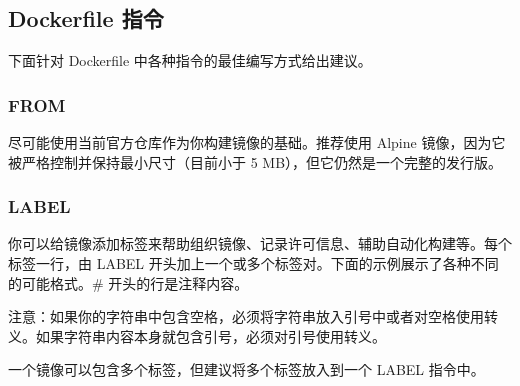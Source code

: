 \documentclass[letterpaper,10pt,english]{sphinxmanual}
\begin{document}
\subsection{Dockerfile 指令}
\label{\detokenize{docker/appendix:dockerfile}}
下面针对 Dockerfile 中各种指令的最佳编写方式给出建议。


\subsubsection{FROM}
\label{\detokenize{docker/appendix:from}}
尽可能使用当前官方仓库作为你构建镜像的基础。推荐使用 Alpine 镜像，因为它被严格控制并保持最小尺寸（目前小于 5 MB），但它仍然是一个完整的发行版。


\subsubsection{LABEL}
\label{\detokenize{docker/appendix:label}}
你可以给镜像添加标签来帮助组织镜像、记录许可信息、辅助自动化构建等。每个标签一行，由 LABEL 开头加上一个或多个标签对。下面的示例展示了各种不同的可能格式。\# 开头的行是注释内容。

注意：如果你的字符串中包含空格，必须将字符串放入引号中或者对空格使用转义。如果字符串内容本身就包含引号，必须对引号使用转义。

\begin{sphinxVerbatim}[commandchars=\\\{\}]
 

 

 

 
\end{sphinxVerbatim}

一个镜像可以包含多个标签，但建议将多个标签放入到一个 LABEL 指令中。
\end{document}
